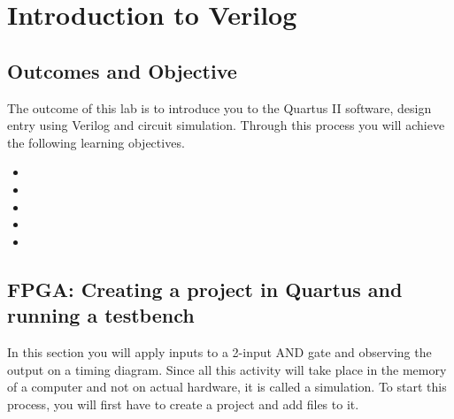 \chapter{Introduction to Verilog}
\label{introductionToVerilog}
\graphicspath{ {./Lab01SimpleVerilog/Fig} }


\section{Outcomes and Objective }

The outcome of this lab is to introduce you to the Quartus II
software, design entry using Verilog and circuit simulation.
Through this process you will achieve the following
learning objectives.
\begin{itemize}
	\itemsep=0em
	\item {}
	\item {}
	\item {}
	\item {}
	\item{}
\end{itemize}

\section{FPGA: Creating a project in Quartus and running a testbench}
In this section you will apply inputs to a 2-input AND gate and
observing the output on a timing diagram.  Since all this activity will
take place in the memory of a computer and not on actual hardware,
it is called a simulation.  To start this process, you will first have to 
create a project and add files to it.

